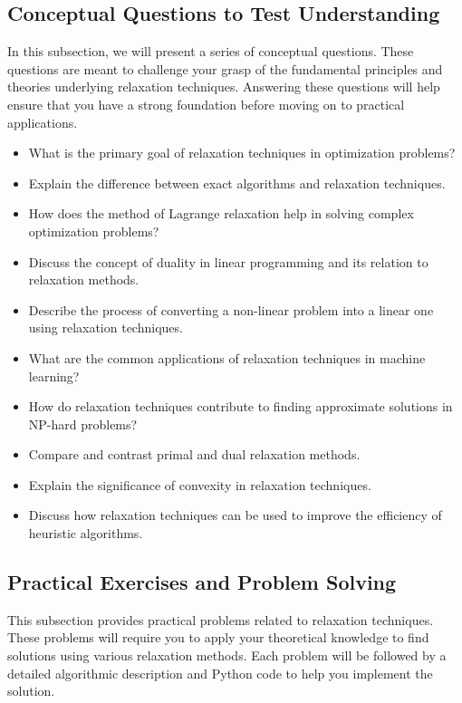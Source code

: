 \documentclass[12pt]{book} %
\begin{document}
\subsection{Conceptual Questions to Test Understanding}
In this subsection, we will present a series of conceptual questions. These questions are meant to challenge your grasp of the fundamental principles and theories underlying relaxation techniques. Answering these questions will help ensure that you have a strong foundation before moving on to practical applications.

\begin{itemize}
    \item What is the primary goal of relaxation techniques in optimization problems?
    \item Explain the difference between exact algorithms and relaxation techniques.
    \item How does the method of Lagrange relaxation help in solving complex optimization problems?
    \item Discuss the concept of duality in linear programming and its relation to relaxation methods.
    \item Describe the process of converting a non-linear problem into a linear one using relaxation techniques.
    \item What are the common applications of relaxation techniques in machine learning?
    \item How do relaxation techniques contribute to finding approximate solutions in NP-hard problems?
    \item Compare and contrast primal and dual relaxation methods.
    \item Explain the significance of convexity in relaxation techniques.
    \item Discuss how relaxation techniques can be used to improve the efficiency of heuristic algorithms.
\end{itemize}

\subsection{Practical Exercises and Problem Solving}
This subsection provides practical problems related to relaxation techniques. These problems will require you to apply your theoretical knowledge to find solutions using various relaxation methods. Each problem will be followed by a detailed algorithmic description and Python code to help you implement the solution.
\end{document}
